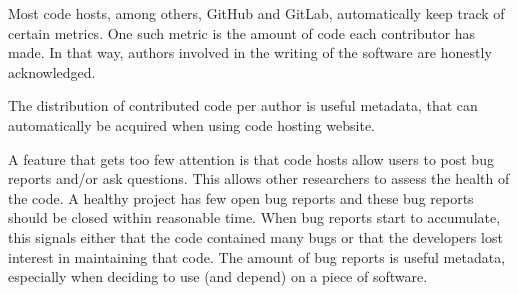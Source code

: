 
Most code hosts, among others, GitHub and GitLab,
automatically keep track of certain metrics.
One such metric is the amount of code each contributor has made.
In that way, authors involved in the writing of the software
are honestly acknowledged. 

The distribution of contributed code per author 
is useful metadata, that can automatically
be acquired when using code hosting website.

A feature that gets too few attention is that code hosts
allow users to post bug reports and/or ask questions.
This allows other researchers to assess the health
of the code.
A healthy project has few open bug reports
and these bug reports should be closed within reasonable time.
When bug reports start to accumulate, this
signals either that the code contained many bugs or that
the developers lost interest in maintaining that code.
The amount of bug reports is useful metadata, 
especially when deciding to use (and depend) on a piece of software.

